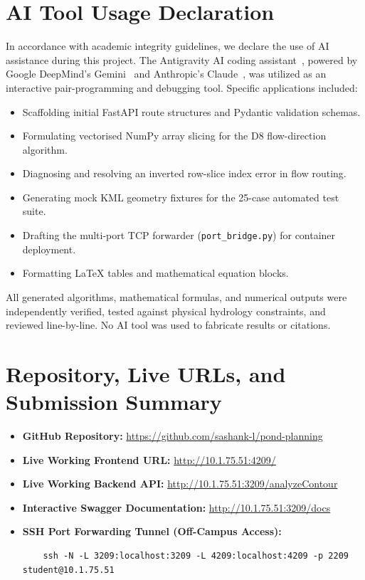\documentclass[manuscript,screen,review]{acmart}
\begin{document}
\section{AI Tool Usage Declaration}
\label{sec:ai-usage}

In accordance with academic integrity guidelines, we declare the use of AI assistance during this project.
The Antigravity AI coding assistant~\cite{antigravity2024}, powered by Google DeepMind's Gemini~\cite{gemini2024}
and Anthropic's Claude~\cite{claude2024}, was utilized as an interactive pair-programming and debugging tool.
Specific applications included:
\begin{itemize}
  \item Scaffolding initial FastAPI route structures and Pydantic validation schemas.
  \item Formulating vectorised NumPy array slicing for the D8 flow-direction algorithm.
  \item Diagnosing and resolving an inverted row-slice index error in flow routing.
  \item Generating mock KML geometry fixtures for the 25-case automated test suite.
  \item Drafting the multi-port TCP forwarder (\texttt{port\_bridge.py}) for container deployment.
  \item Formatting LaTeX tables and mathematical equation blocks.
\end{itemize}
All generated algorithms, mathematical formulas, and numerical outputs were independently verified,
tested against physical hydrology constraints, and reviewed line-by-line. No AI tool was used to fabricate results or citations.

\appendix

\section{Repository, Live URLs, and Submission Summary}

\begin{itemize}
  \item \textbf{GitHub Repository:} \url{https://github.com/sashank-l/pond-planning}
  \item \textbf{Live Working Frontend URL:} \url{http://10.1.75.51:4209/}
  \item \textbf{Live Working Backend API:} \url{http://10.1.75.51:3209/analyzeContour}
  \item \textbf{Interactive Swagger Documentation:} \url{http://10.1.75.51:3209/docs}
  \item \textbf{SSH Port Forwarding Tunnel (Off-Campus Access):}
    \begin{verbatim}
    ssh -N -L 3209:localhost:3209 -L 4209:localhost:4209 -p 2209 student@10.1.75.51
    \end{verbatim}
\end{itemize}



\end{document}
